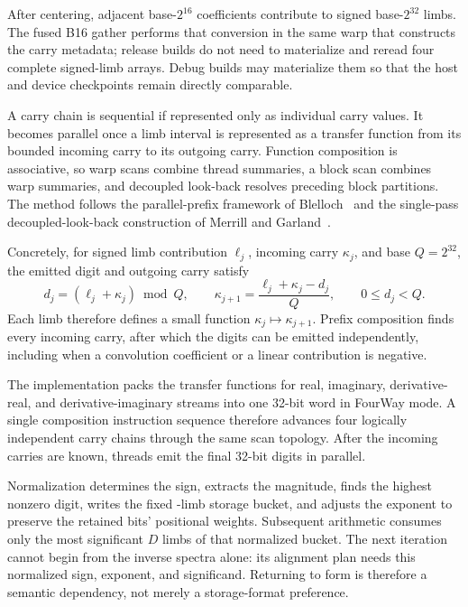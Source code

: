 After centering, adjacent base-$2^{16}$ coefficients contribute to signed
base-$2^{32}$ limbs.  The fused B16 gather performs that conversion in the same
warp that constructs the carry metadata; release builds do not need to
materialize and reread four complete signed-limb arrays.  Debug builds may
materialize them so that the host and device checkpoints remain directly
comparable.

A carry chain is sequential if represented only as individual carry values.
It becomes parallel once a limb interval is represented as a transfer function
from its bounded incoming carry to its outgoing carry.  Function composition is
associative, so warp scans combine thread summaries, a block scan combines warp
summaries, and decoupled look-back resolves preceding block partitions.  The
method follows the parallel-prefix framework of Blelloch~\cite{Blelloch1990PrefixSums}
and the single-pass decoupled-look-back construction of Merrill and
Garland~\cite{merrill2016single}.

Concretely, for signed limb contribution $\ell_j$, incoming carry $\kappa_j$,
and base $Q=2^{32}$, the emitted digit and outgoing carry satisfy
\begin{equation}
  d_j=(\ell_j+\kappa_j)\bmod Q,
  \qquad
  \kappa_{j+1}=\frac{\ell_j+\kappa_j-d_j}{Q},
  \qquad 0\le d_j<Q.
  \label{eq:reference-signed-carry}
\end{equation}
Each limb therefore defines a small function
$\kappa_j\mapsto\kappa_{j+1}$.  Prefix composition finds every incoming
carry, after which the digits can be emitted independently, including when a
convolution coefficient or a linear contribution is negative.

The implementation packs the transfer functions for real, imaginary,
derivative-real, and derivative-imaginary streams into one 32-bit word in
FourWay mode.  A single composition instruction sequence therefore advances
four logically independent carry chains through the same scan topology.  After
the incoming carries are known, threads emit the final 32-bit digits in
parallel.

Normalization determines the sign, extracts the magnitude, finds the highest
nonzero digit, writes the fixed -limb storage bucket, and
adjusts the exponent to preserve the retained bits' positional weights.
Subsequent arithmetic consumes only the most significant $D$ limbs of that
normalized bucket.  The next
iteration cannot begin from the inverse spectra alone: its alignment plan needs
this normalized sign, exponent, and significand.  Returning to
 form is therefore a semantic dependency, not merely a
storage-format preference.


